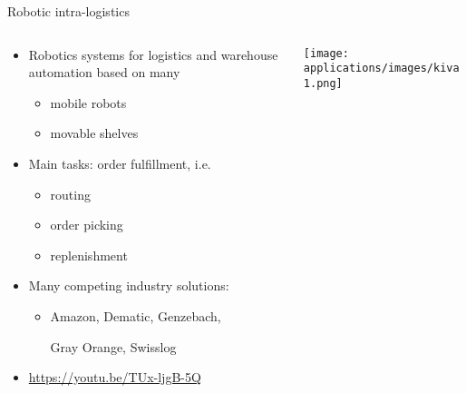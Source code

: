 \begin{frame}{Robotic intra-logistics}
  \begin{columns}
    \begin{column}{0.69\textwidth}
      \begin{itemize}
      \item \alert{Robotics systems} for \alert{logistics} and \alert{warehouse automation}
        based on many
        \begin{itemize}
        \item mobile robots
        \item movable shelves
        \end{itemize}
        \smallskip
      \item Main tasks: \alert{order fulfillment}, i.e.
        \begin{itemize}
        \item routing
        \item order picking
        \item replenishment
        \end{itemize} %
        \smallskip
      \item Many competing \alert{industry solutions}:
        \begin{itemize}
        \item
          Amazon,
          Dematic,
          Genzebach,\par
          Gray Orange,
          Swisslog
        \end{itemize}
      \item \url{https://youtu.be/TUx-ljgB-5Q}
      \end{itemize}
    \end{column}
    \begin{column}{0.35\textwidth}  %
      \begin{center}
        \texttt{[image: applications/images/kiva1.png]}
      \end{center}
    \end{column}
  \end{columns}
\end{frame}
